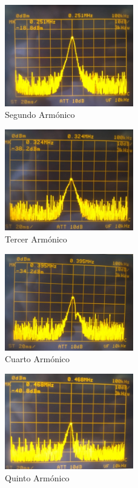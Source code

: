 \begin{figure}[H]
	\centering
	\includegraphics[width=0.5\textwidth]{Imagenes-Ej1/2Armonico.jpeg}
	\caption{Segundo Armónico}
	\label{fig:2do}
\end{figure}
\begin{figure}[H]
	\centering
	\includegraphics[width=0.5\textwidth]{Imagenes-Ej1/3Armonico.jpeg}
	\caption{Tercer Armónico}
	\label{fig:3er}
\end{figure}
\begin{figure}[H]
	\centering
	\includegraphics[width=0.5\textwidth]{Imagenes-Ej1/4Armonico.jpeg}
	\caption{Cuarto Armónico}
	\label{fig:4to}
\end{figure}
\begin{figure}[H]
	\centering
	\includegraphics[width=0.5\textwidth]{Imagenes-Ej1/5Armonico.jpeg}
	\caption{Quinto Armónico}
	\label{fig:5to}
\end{figure}
